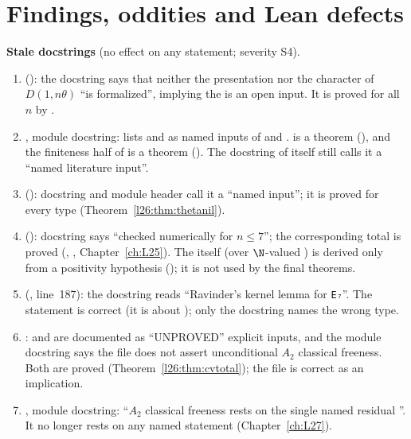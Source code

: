 \section{Findings, oddities and Lean defects}\label{l26:sec:defects}

\begin{warning}
\textbf{Stale docstrings} (no effect on any statement; severity S4).
\begin{enumerate}
\item {} (): the docstring says that neither the presentation nor the
  character of $D(1,n\theta)$ ``is formalized'', implying the  is an open input. It is proved for all $n$ by
  .
\item {}, module docstring: lists  and  as named
  inputs of  and .  is a theorem (), and the finiteness
  half of  is a theorem (). The docstring of  itself
  still calls it a ``named literature input''.
\item {} (): docstring and module header call it a ``named input''; it is
  proved for every type (Theorem~\ref{l26:thm:thetanil}).
\item {} (): docstring says ``checked numerically for
  $n\le7$''; the corresponding total is proved (, , Chapter~\ref{ch:L25}). The
    itself (over $\N$-valued ) is derived only from a positivity hypothesis
  (); it is not used by the final theorems.
\item {} (, line~187): the docstring reads ``Ravinder's kernel lemma
  for \texttt{E₇}''. The statement is correct (it is about ); only the docstring names the wrong type.
\item {}:  and  are documented as
  ``UNPROVED'' explicit inputs, and the module docstring says the file does not assert unconditional $A_2$ classical freeness. Both
  are proved (Theorem~\ref{l26:thm:cvtotal}); the file is correct as an implication.
\item {}, module docstring: ``$A_2$ classical freeness rests on the single named residual
  ''. It no longer rests on any named statement (Chapter~\ref{ch:L27}).
\end{enumerate}
\end{warning}



